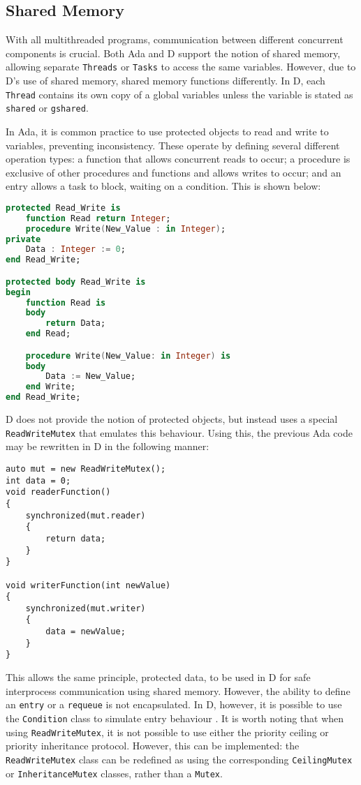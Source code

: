 \subsection{Shared Memory}
With all multithreaded programs, communication between different concurrent
components is crucial. Both Ada and D support the notion of shared memory,
allowing separate \texttt{Threads} or \texttt{Tasks} to access the same
variables. However, due to D's use of shared memory, shared memory functions
differently. In D, each \texttt{Thread} contains its own copy of a global 
variables unless the variable is stated 
as \texttt{shared} or \texttt{\textunderscore{}\textunderscore{}gshared}. 
\par\bigskip\noindent
In Ada, it is common practice to use protected objects to read and write to
variables, preventing inconsistency. These operate by defining several different 
operation types: a function that allows concurrent reads to occur; a procedure
is exclusive of other procedures and functions and allows writes to occur; 
and an entry allows a task to block, waiting on a condition. This is shown
below: 
\begin{lstlisting}[basicstyle=\small,language=Ada]
protected Read_Write is
    function Read return Integer;
    procedure Write(New_Value : in Integer); 
private 
    Data : Integer := 0; 
end Read_Write;

protected body Read_Write is 
begin 
    function Read is 
    body 
        return Data; 
    end Read; 

    procedure Write(New_Value: in Integer) is 
    body
        Data := New_Value; 
    end Write; 
end Read_Write; 
\end{lstlisting}
D does not provide the notion of protected objects, but instead uses a
special \texttt{ReadWriteMutex} that emulates this behaviour.
Using this, the previous Ada code may be rewritten in D
in the following manner: 
\begin{lstlisting}[basicstyle=\small]
auto mut = new ReadWriteMutex(); 
int data = 0; 
void readerFunction()
{
    synchronized(mut.reader)
    {
        return data; 
    }
}

void writerFunction(int newValue)
{
    synchronized(mut.writer)
    {
        data = newValue;
    }
}
\end{lstlisting}
This allows the same principle, protected data, to be used in D for
safe interprocess communication using shared memory. However, the ability to 
define an \texttt{entry} or a \texttt{requeue} is not encapsulated. In D,
however, it is 
possible to use the \texttt{Condition} class to simulate entry behaviour 
\cite{dlang-condition}. 
It is worth noting that when using \texttt{ReadWriteMutex}, it is not possible to 
use either the priority ceiling or priority inheritance protocol.
However, this can be implemented: the \texttt{ReadWriteMutex} class
can be redefined as using the corresponding \texttt{CeilingMutex} or
\texttt{InheritanceMutex} classes, rather than a \texttt{Mutex}. 

